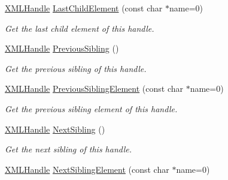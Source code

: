 \begin{DoxyCompactItemize}
\hyperlink{classCPlantBox_1_1tinyxml2_1_1XMLHandle}{X\+M\+L\+Handle} \hyperlink{classCPlantBox_1_1tinyxml2_1_1XMLHandle_ae9a2b91042cf0b6030254ded9418c938}{Last\+Child\+Element} (const char $\ast$name=0)
\begin{DoxyCompactList}\small\item\em Get the last child element of this handle. \end{DoxyCompactList}\item 
\mbox{\label{classCPlantBox_1_1tinyxml2_1_1XMLHandle_aa0b92803e5fd1a24e3b928badb58d059}} 
\hyperlink{classCPlantBox_1_1tinyxml2_1_1XMLHandle}{X\+M\+L\+Handle} \hyperlink{classCPlantBox_1_1tinyxml2_1_1XMLHandle_aa0b92803e5fd1a24e3b928badb58d059}{Previous\+Sibling} ()
\begin{DoxyCompactList}\small\item\em Get the previous sibling of this handle. \end{DoxyCompactList}\item 
\mbox{\label{classCPlantBox_1_1tinyxml2_1_1XMLHandle_abf29da510ab3538894876584f1799517}} 
\hyperlink{classCPlantBox_1_1tinyxml2_1_1XMLHandle}{X\+M\+L\+Handle} \hyperlink{classCPlantBox_1_1tinyxml2_1_1XMLHandle_abf29da510ab3538894876584f1799517}{Previous\+Sibling\+Element} (const char $\ast$name=0)
\begin{DoxyCompactList}\small\item\em Get the previous sibling element of this handle. \end{DoxyCompactList}\item 
\mbox{\label{classCPlantBox_1_1tinyxml2_1_1XMLHandle_a1fb33eb9fc10582b078af72992509064}} 
\hyperlink{classCPlantBox_1_1tinyxml2_1_1XMLHandle}{X\+M\+L\+Handle} \hyperlink{classCPlantBox_1_1tinyxml2_1_1XMLHandle_a1fb33eb9fc10582b078af72992509064}{Next\+Sibling} ()
\begin{DoxyCompactList}\small\item\em Get the next sibling of this handle. \end{DoxyCompactList}\item 
\mbox{\label{classCPlantBox_1_1tinyxml2_1_1XMLHandle_adece4e001382544293e12bad4f6432a8}} 
\hyperlink{classCPlantBox_1_1tinyxml2_1_1XMLHandle}{X\+M\+L\+Handle} \hyperlink{classCPlantBox_1_1tinyxml2_1_1XMLHandle_adece4e001382544293e12bad4f6432a8}{Next\+Sibling\+Element} (const char $\ast$name=0)

\end{DoxyCompactItemize}
